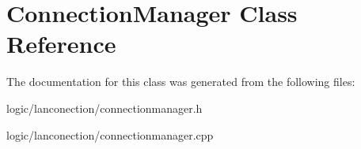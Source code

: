 \hypertarget{class_connection_manager}{\section{Connection\-Manager Class Reference}
\label{class_connection_manager}
}


The documentation for this class was generated from the following files\-:\begin{DoxyCompactItemize}
\item 
logic/lanconection/connectionmanager.\-h\item 
logic/lanconection/connectionmanager.\-cpp\end{DoxyCompactItemize}
